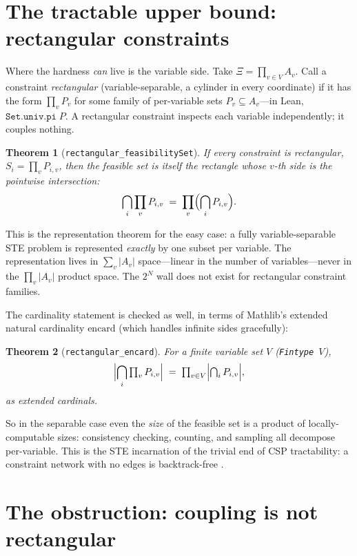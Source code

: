 \documentclass[11pt]{article}
\newtheorem{theorem}{Theorem}
\newcommand{\lean}[1]{\texttt{#1}}
\newcommand{\Xii}{\Xi}
\begin{document}
\section{The tractable upper bound: rectangular constraints}

Where the hardness \emph{can} live is the variable side.  Take
$\Xii = \prod_{v \in V} A_v$.  Call a constraint \emph{rectangular}
(variable-separable, a cylinder in every coordinate) if it has the form
$\prod_{v} P_v$ for some family of per-variable sets
$P_v \subseteq A_v$---in Lean, $\lean{Set.univ.pi}\;P$.  A rectangular
constraint inspects each variable independently; it couples nothing.

\begin{theorem}[\lean{rectangular\_feasibilitySet}]
If every constraint is rectangular, $S_i = \prod_v P_{i,v}$, then the
feasible set is itself the rectangle whose $v$-th side is the pointwise
intersection:
\[
  \bigcap_{i} \prod_{v} P_{i,v}
  \;=\; \prod_{v} \Bigl(\bigcap_{i} P_{i,v}\Bigr).
\]
\end{theorem}

This is the representation theorem for the easy case: a fully
variable-separable STE problem is represented \emph{exactly} by one
subset per variable.  The representation lives in
$\sum_{v} |A_v|$ space---linear in the number of variables---never in
the $\prod_v |A_v|$ product space.  The $2^N$ wall does not exist for
rectangular constraint families.

The cardinality statement is checked as well, in terms of Mathlib's
extended natural cardinality $\mathrm{encard}$ (which handles infinite
sides gracefully):

\begin{theorem}[\lean{rectangular\_encard}]
For a finite variable set $V$ (\lean{Fintype}~$V$),
\[
  \Bigl|\bigcap_i \textstyle\prod_v P_{i,v}\Bigr|
  \;=\; \prod_{v \in V} \Bigl|\bigcap_i P_{i,v}\Bigr|,
\]
as extended cardinals.
\end{theorem}

So in the separable case even the \emph{size} of the feasible set is a
product of locally-computable sizes: consistency checking, counting,
and sampling all decompose per-variable.  This is the STE incarnation
of the trivial end of CSP tractability: a constraint network with no
edges is backtrack-free \citep{freuder1982backtrack}.

\section{The obstruction: coupling is not rectangular}
\end{document}
